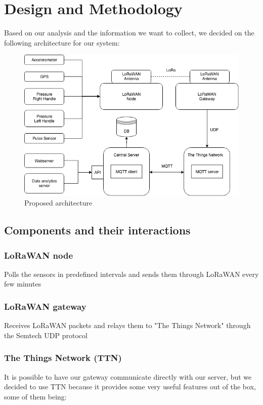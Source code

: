 \chapter{Design and Methodology}
\label{cha:design-and-method}

Based on our analysis and the information we want to collect, we decided on the following architecture for our system:

\begin{figure}[h]
\centering
\includegraphics[width=1\linewidth]{gfx/architecture}
\caption{Proposed architecture}
\label{fig:image1}
\end{figure}

\section{Components and their interactions}


	\subsection{LoRaWAN node}
		Polls the sensors in predefined intervals and sends them through LoRaWAN every few minutes

	\subsection{LoRaWAN gateway}
		Receives LoRaWAN packets and relays them to "The Things Network" through the Semtech UDP protocol

	\subsection{The Things Network (TTN)}
		It is possible to have our gateway communicate directly with our server, but we decided to use TTN because it provides some very useful features out of the box, some of them being:

